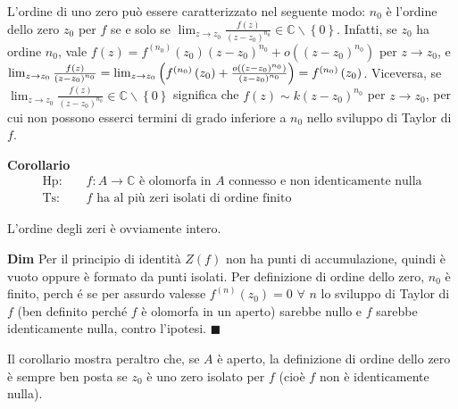 \documentclass{article}
\begin{document}
L'ordine di uno zero pu\`{o} essere caratterizzato nel seguente modo: $n_{0}$
\`{e} l'ordine dello zero $z_{0}$ per $f$ se e solo se $\lim_{z\rightarrow
z_{0}}\frac{f\left( z\right) }{\left( z-z_{0}\right) ^{n_{0}}}\in 
\mathbb{C}
\backslash \left\{ 0\right\} $. Infatti, se $z_{0}$ ha ordine $n_{0}$, vale $%
f\left( z\right) =f^{\left( n_{0}\right) }\left( z_{0}\right) \left(
z-z_{0}\right) ^{n_{0}}+o\left( \left( z-z_{0}\right) ^{n_{0}}\right) $ per $%
z\rightarrow z_{0}$, e $\lim_{z\rightarrow z_{0}}\frac{f\left( z\right) }{%
\left( z-z_{0}\right) ^{n_{0}}}=\lim_{z\rightarrow z_{0}}\left( f^{\left(
n_{0}\right) }\left( z_{0}\right) +\frac{o\left( \left( z-z_{0}\right)
^{n_{0}}\right) }{\left( z-z_{0}\right) ^{n_{0}}}\right) =f^{\left(
n_{0}\right) }\left( z_{0}\right) $. Viceversa, se $\lim_{z\rightarrow z_{0}}%
\frac{f\left( z\right) }{\left( z-z_{0}\right) ^{n_{0}}}\in 
\mathbb{C}
\backslash \left\{ 0\right\} $ significa che $f\left( z\right) \sim k\left(
z-z_{0}\right) ^{n_{0}}$ per $z\rightarrow z_{0}$, per cui non possono
esserci termini di grado inferiore a $n_{0}$ nello sviluppo di Taylor di $f$.

\textbf{Corollario}%
\begin{eqnarray*}
\text{Hp}\text{: } &&f:A\rightarrow 
\mathbb{C}
\text{ \`{e} olomorfa in }A\text{ connesso e non identicamente nulla} \\
\text{Ts}\text{: } &&f\text{ ha al pi\`{u} zeri isolati di ordine finito}
\end{eqnarray*}

L'ordine degli zeri \`{e} ovviamente intero.

\textbf{Dim} Per il principio di identit\`{a} $Z\left( f\right) $ non ha
punti di accumulazione, quindi \`{e} vuoto oppure \`{e} formato da punti
isolati. Per definizione di ordine dello zero, $n_{0}$ \`{e} finito, perch%
\'{e} se per assurdo valesse $f^{\left( n\right) }\left( z_{0}\right) =0$ $%
\forall $ $n$ lo sviluppo di Taylor di $f$ (ben definito perch\'{e} $f$ \`{e}
olomorfa in un aperto) sarebbe nullo e $f$ sarebbe identicamente nulla,
contro l'ipotesi. $\blacksquare $

Il corollario mostra peraltro che, se $A$ \`{e} aperto, la definizione di
ordine dello zero \`{e} sempre ben posta se $z_{0}$ \`{e} uno zero isolato
per $f$ (cio\`{e} $f$ non \`{e} identicamente nulla).
\end{document}
